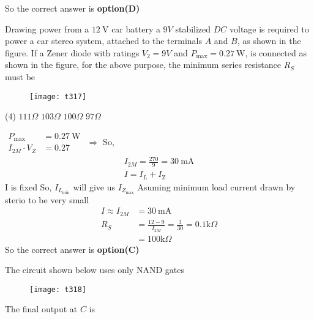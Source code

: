 \begin{questions}
\begin{answer}
\begin{figure}[H]
\end{figure}
	So the correct answer is \textbf{option(D)}
\end{answer}
\begin{minipage}{\textwidth}
	\question Drawing power from a $12 \mathrm{~V}$ car battery a $9 V$ stabilized $D C$ voltage is required to power a car stereo system, attached to the terminals $A$ and $B$, as shown in the figure.
	If a Zener diode with ratings $V_{2}=9 V$ and $P_{\max }=0.27 \mathrm{~W}$, is connected as shown in the figure, for the above purpose, the minimum series resistance $R_{S}$ must be
\end{minipage}
\begin{figure}[H]
	\centering
	\texttt{[image: t317]}
\end{figure}
\begin{tasks}(4)
	\task[\textbf{A.}] $111 \Omega$
	\task[\textbf{B.}]   $103 \Omega$
	\task[\textbf{C.}] $100 \Omega$
	\task[\textbf{D.}] $97 \Omega$
\end{tasks}
\begin{answer}
	$\begin{aligned} P_{\max } &=0.27 \mathrm{~W} \\ I_{2 M} \cdot V_{Z} &=0.27 \end{aligned}$
	$\Rightarrow$
	So,
	$$
	\begin{gathered}
	I_{2 M}=\frac{270}{9}=30 \mathrm{~mA} \\
	I=I_{L}+I_{\mathrm{Z}}
	\end{gathered}
	$$
	I is fixed So, $I_{L_{\min }}$ will give us $I_{Z_{\max }}$ Asuming minimum load current drawn by sterio to be very small
	$$
	\begin{aligned}
	I \approx I_{2 M} &=30 \mathrm{~mA} \\
	R_{S} &=\frac{12-9}{I_{2 M}}=\frac{3}{30}=0.1 \mathrm{k} \Omega \\
	&=100 \mathrm{k} \Omega
	\end{aligned}
	$$
	So the correct answer is \textbf{option(C)}
\end{answer}
\begin{minipage}{\textwidth}
	\question The circuit shown below uses only NAND gates\\
	\begin{figure}[H]
		\centering
		\texttt{[image: t318]}
	\end{figure}
	The final output at $C$ is
\end{minipage}

\end{questions}
